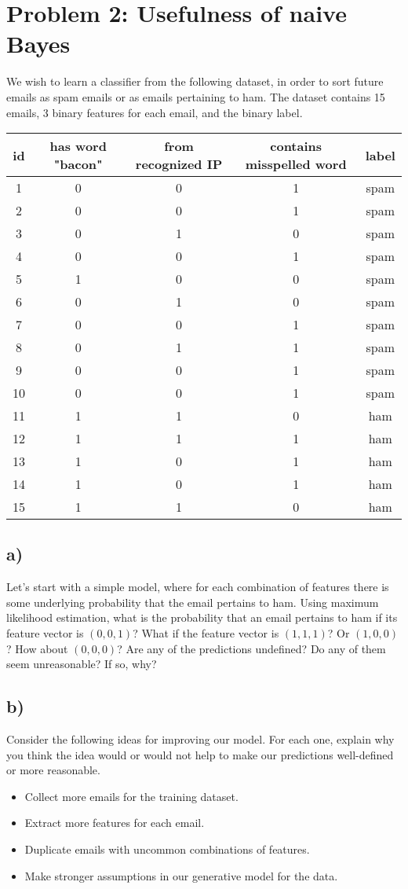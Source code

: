\documentclass[a4paper]{article}
\begin{document}
\section*{Problem 2: Usefulness of naive Bayes}
We wish to learn a classifier from the following dataset, in order to sort future emails as spam emails or as emails pertaining to ham. The dataset contains 15 emails, 3 binary features for each email, and the binary label.
\begin{center}
\begin{tabular}{ c | c c c | c }
 id & has word "bacon" & from recognized IP & contains misspelled word & label \\ 
 \hline
 1 & 0 & 0 & 1 & spam \\
 2 & 0 & 0 & 1 & spam \\
 3 & 0 & 1 & 0 & spam \\
 4 & 0 & 0 & 1 & spam \\
 5 & 1 & 0 & 0 & spam \\
 6 & 0 & 1 & 0 & spam \\
 7 & 0 & 0 & 1 & spam \\
 8 & 0 & 1 & 1 & spam \\
 9 & 0 & 0 & 1 & spam \\
 10 & 0 & 0 & 1 & spam \\
 11 & 1 & 1 & 0 & ham \\
 12 & 1 & 1 & 1 & ham \\
 13 & 1 & 0 & 1 & ham \\
 14 & 1 & 0 & 1 & ham \\
 15 & 1 & 1 & 0 & ham
\end{tabular}
\end{center}
\subsection*{a)}
Let's start with a simple model, where for each combination of features there is some underlying probability that the email pertains to ham. Using maximum likelihood estimation, what is the probability that an email pertains to ham if its feature vector is $(0,0,1)$? What if the feature vector is $(1,1,1)$? Or $(1,0,0)$? How about $(0,0,0)$? Are any of the predictions undefined? Do any of them seem unreasonable? If so, why?
\subsection*{b)}
Consider the following ideas for improving our model. For each one, explain why you think the idea would or would not help to make our predictions well-defined or more reasonable.
\begin{itemize}
\item Collect more emails for the training dataset.
\item Extract more features for each email.
\item Duplicate emails with uncommon combinations of features.
\item Make stronger assumptions in our generative model for the data.
\end{itemize}
\end{document}
